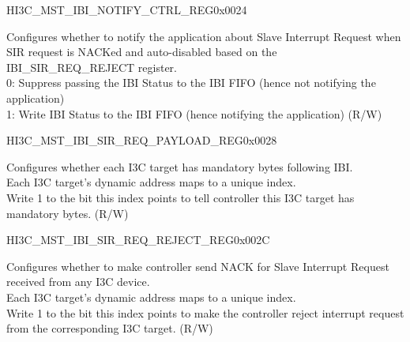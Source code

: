 \begin{register}{H}{I3C\_MST\_IBI\_NOTIFY\_CTRL\_REG}{0x0024}\label{regdesc:I3CMSTIBINOTIFYCTRLREG}
%
%
%
\regnewline%
\begin{regdesc}\begin{reglist}
\label{fielddesc:I3CMSTREGNOTIFYSIRREJECTED}\item [I3C\_MST\_REG\_NOTIFY\_SIR\_REJECTED] Configures whether to notify the application about Slave Interrupt Request when SIR request is NACKed and auto-disabled based on the IBI\_SIR\_REQ\_REJECT register.\\
0: Suppress passing the IBI Status to the IBI FIFO (hence not notifying the application)\\
1: Write IBI Status to the IBI FIFO (hence notifying the application) (R/W)
\end{reglist}\end{regdesc}
\end{register}


\begin{register}{H}{I3C\_MST\_IBI\_SIR\_REQ\_PAYLOAD\_REG}{0x0028}\label{regdesc:I3CMSTIBISIRREQPAYLOADREG}
%
\regnewline%
\begin{regdesc}\begin{reglist}
\label{fielddesc:I3CMSTREGSIRREQPAYLOAD}\item [I3C\_MST\_REG\_SIR\_REQ\_PAYLOAD] Configures whether each I3C target has mandatory bytes following IBI.\\
Each I3C target's dynamic address maps to a unique index.\\
Write 1 to the bit this index points to tell controller this I3C target has mandatory bytes. (R/W)
\end{reglist}\end{regdesc}
\end{register}


\begin{register}{H}{I3C\_MST\_IBI\_SIR\_REQ\_REJECT\_REG}{0x002C}\label{regdesc:I3CMSTIBISIRREQREJECTREG}
%
\regnewline%
\begin{regdesc}\begin{reglist}
\label{fielddesc:I3CMSTREGSIRREQREJECT}\item [I3C\_MST\_REG\_SIR\_REQ\_REJECT] Configures whether to make controller send NACK for Slave Interrupt Request received from any I3C device.\\
Each I3C target's dynamic address maps to a unique index.\\
Write 1 to the bit this index points to make the controller reject interrupt request from the corresponding I3C target. (R/W)
\end{reglist}\end{regdesc}
\end{register}


